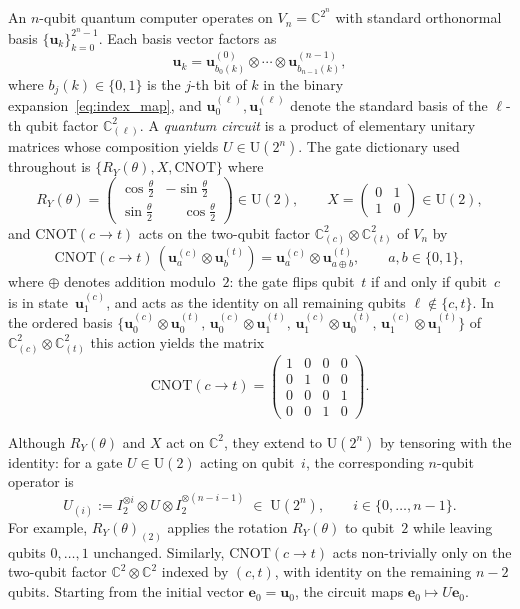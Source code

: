 \documentclass[12pt,a4paper]{article}
\theoremstyle{plain}
\theoremstyle{definition}
\theoremstyle{remark}
\begin{document}
An $n$-qubit quantum computer operates on $V_n = \mathbb{C}^{2^n}$
with standard orthonormal basis $\{\mathbf{u}_k\}_{k=0}^{2^n-1}$.
Each basis vector factors as
\[
  \mathbf{u}_k = \mathbf{u}_{b_0(k)}^{(0)} \otimes \cdots
                 \otimes \mathbf{u}_{b_{n-1}(k)}^{(n-1)},
\]
where $b_j(k)\in\{0,1\}$ is the $j$-th bit of $k$ in the binary
expansion~\eqref{eq:index_map}, and $\mathbf{u}_0^{(\ell)},
\mathbf{u}_1^{(\ell)}$ denote the standard basis of the $\ell$-th
qubit factor $\mathbb{C}^2_{(\ell)}$.
A \emph{quantum circuit} is a product of elementary unitary matrices
whose composition yields $U \in \mathrm{U}(2^n)$.
The gate dictionary used throughout is $\{R_Y(\theta), X, \mathrm{CNOT}\}$
where
\[
R_Y(\theta) = \begin{pmatrix}
\cos\frac{\theta}{2} & -\sin\frac{\theta}{2} \\
\sin\frac{\theta}{2} & \phantom{-}\cos\frac{\theta}{2}
\end{pmatrix} \in \mathrm{U}(2),
\qquad
X = \begin{pmatrix} 0 & 1 \\ 1 & 0 \end{pmatrix} \in \mathrm{U}(2),
\]
and $\mathrm{CNOT}(c\to t)$ acts on the two-qubit factor
$\mathbb{C}^2_{(c)}\otimes\mathbb{C}^2_{(t)}$ of $V_n$ by
\begin{equation*}
  \mathrm{CNOT}(c\to t)\,(\mathbf{u}_a^{(c)} \otimes \mathbf{u}_b^{(t)})
  = \mathbf{u}_a^{(c)} \otimes \mathbf{u}_{a \oplus b}^{(t)},
  \qquad a,b \in \{0,1\},
\end{equation*}
where $\oplus$ denotes addition modulo~$2$: the gate flips qubit~$t$
if and only if qubit~$c$ is in state~$\mathbf{u}_1^{(c)}$, and acts
as the identity on all remaining qubits $\ell \notin \{c,t\}$.
In the ordered basis
$\{\mathbf{u}_0^{(c)}\otimes\mathbf{u}_0^{(t)},\,
   \mathbf{u}_0^{(c)}\otimes\mathbf{u}_1^{(t)},\,
   \mathbf{u}_1^{(c)}\otimes\mathbf{u}_0^{(t)},\,
   \mathbf{u}_1^{(c)}\otimes\mathbf{u}_1^{(t)}\}$
of $\mathbb{C}^2_{(c)}\otimes\mathbb{C}^2_{(t)}$
this action yields the matrix
\[
\mathrm{CNOT}(c\to t) = \begin{pmatrix}
1 & 0 & 0 & 0 \\
0 & 1 & 0 & 0 \\
0 & 0 & 0 & 1 \\
0 & 0 & 1 & 0
\end{pmatrix}.
\]

Although $R_Y(\theta)$ and $X$ act on $\mathbb{C}^2$, they extend to
$\mathrm{U}(2^n)$ by tensoring with the identity: for a gate
$U\in\mathrm{U}(2)$ acting on qubit~$i$, the corresponding $n$-qubit
operator is
\[
  U_{(i)} := I_2^{\otimes i} \otimes U \otimes I_2^{\otimes(n-i-1)}
  \;\in\;\mathrm{U}(2^n),
  \qquad i\in\{0,\ldots,n-1\}.
\]
For example, $R_Y(\theta)_{(2)}$ applies the rotation $R_Y(\theta)$ to
qubit~$2$ while leaving qubits $0,\ldots,1$ unchanged.
Similarly, $\mathrm{CNOT}(c\to t)$ acts non-trivially only on the
two-qubit factor $\mathbb{C}^2\otimes\mathbb{C}^2$ indexed by
$(c,t)$, with identity on the remaining $n-2$ qubits.
Starting from the initial vector $\mathbf{e}_0 = \mathbf{u}_0$,
the circuit maps $\mathbf{e}_0 \mapsto U\mathbf{e}_0$.
\end{document}
